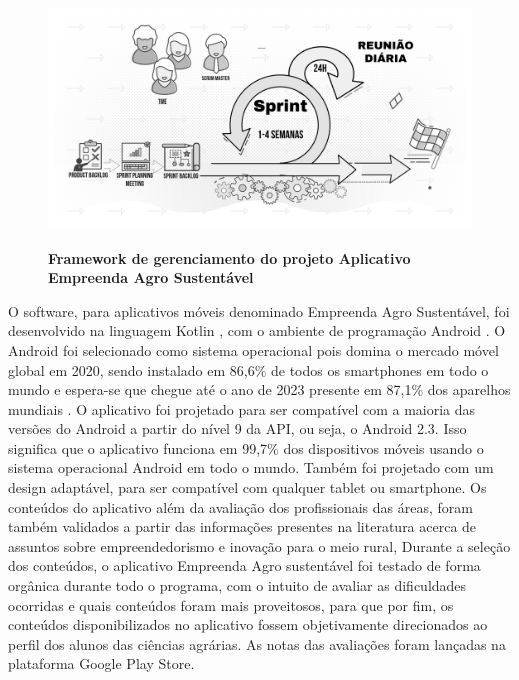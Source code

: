 \begin{figure}[H]
\centering
\caption{\textbf{Framework de gerenciamento do projeto Aplicativo Empreenda Agro Sustentável }}
\includegraphics[scale=0.1]{Imagens/scrum.png}
\label{figura_47}
\end{figure}

O software, para aplicativos móveis denominado Empreenda Agro Sustentável, foi desenvolvido na linguagem Kotlin \cite{smyth_kotlinandroid_2017}, com o ambiente de programação Android \cite{android_conheco_2019}. O Android foi selecionado como sistema operacional pois domina o mercado móvel global em 2020, sendo instalado em 86,6\% de todos os smartphones em todo o mundo e espera-se que chegue até o ano de 2023 presente em 87,1\% dos aparelhos mundiais \cite{idc_idc_2020}. 
O aplicativo foi projetado para ser compatível com a maioria das versões do Android a partir do nível 9 da API, ou seja, o Android 2.3. Isso significa que o aplicativo funciona em 99,7\% dos dispositivos móveis usando o sistema operacional Android em todo o mundo. Também foi projetado com um design adaptável, para ser compatível com qualquer tablet ou smartphone. 
Os conteúdos do aplicativo além da avaliação dos profissionais das áreas, foram também validados a partir das informações presentes na literatura acerca de assuntos sobre empreendedorismo e inovação para o meio rural, \cite{melo_sebrae_2008, oliveira_perfil_2006}
Durante a seleção dos conteúdos, o aplicativo Empreenda Agro sustentável foi testado de forma orgânica durante todo o programa, com o intuito de avaliar as dificuldades ocorridas e quais conteúdos foram mais proveitosos, para que por fim, os conteúdos disponibilizados no aplicativo fossem objetivamente direcionados ao perfil dos alunos das ciências agrárias. As notas das avaliações foram lançadas na plataforma Google Play Store. 


